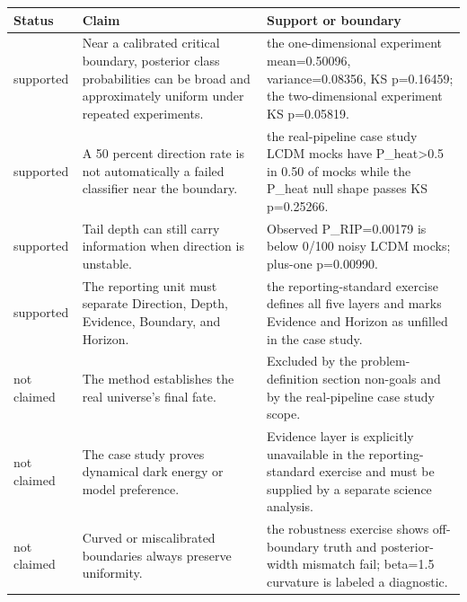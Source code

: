 \documentclass[
]{article}
\newcounter{none} %
\begin{document}
{\def\LTcaptype{none} %
\begin{longtable}[]{@{}
  >{\raggedright\arraybackslash}p{}
  >{\raggedright\arraybackslash}p{}
  >{\raggedright\arraybackslash}p{}@{}}
\toprule\noalign{}
\begin{minipage}[b]{\linewidth}\raggedright
Status
\end{minipage} & \begin{minipage}[b]{\linewidth}\raggedright
Claim
\end{minipage} & \begin{minipage}[b]{\linewidth}\raggedright
Support or boundary
\end{minipage} \\
\midrule\noalign{}
\endhead
\bottomrule\noalign{}
\endlastfoot
supported & Near a calibrated critical boundary, posterior class
probabilities can be broad and approximately uniform under repeated
experiments. & the one-dimensional experiment mean=0.50096,
variance=0.08356, KS p=0.16459; the two-dimensional experiment KS
p=0.05819. \\
supported & A 50 percent direction rate is not automatically a failed
classifier near the boundary. & the real-pipeline case study LCDM mocks
have P\_heat\textgreater0.5 in 0.50 of mocks while the P\_heat null
shape passes KS p=0.25266. \\
supported & Tail depth can still carry information when direction is
unstable. & Observed P\_RIP=0.00179 is below 0/100 noisy LCDM mocks;
plus-one p=0.00990. \\
supported & The reporting unit must separate Direction, Depth, Evidence,
Boundary, and Horizon. & the reporting-standard exercise defines all
five layers and marks Evidence and Horizon as unfilled in the case
study. \\
not claimed & The method establishes the real universe's final fate. &
Excluded by the problem-definition section non-goals and by the
real-pipeline case study scope. \\
not claimed & The case study proves dynamical dark energy or model
preference. & Evidence layer is explicitly unavailable in the
reporting-standard exercise and must be supplied by a separate science
analysis. \\
not claimed & Curved or miscalibrated boundaries always preserve
uniformity. & the robustness exercise shows off-boundary truth and
posterior-width mismatch fail; beta=1.5 curvature is labeled a
diagnostic. \\
\end{longtable}
}
\end{document}
